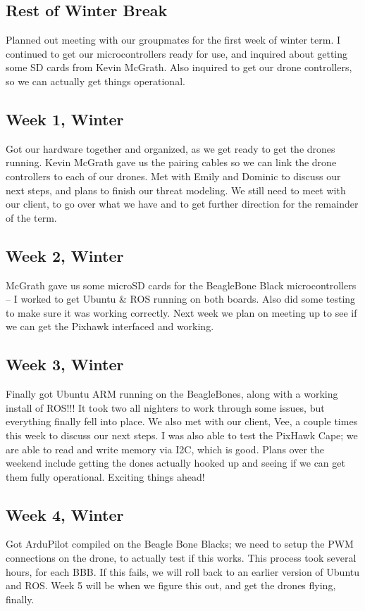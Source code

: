 \documentclass[IEEEtran,letterpaper,10pt,notitlepage,draftclsnofoot,onecolumn]{article}
\begin{document}
\subsection{Rest of Winter Break}
Planned out meeting with our groupmates for the first week of winter term. I continued to get our microcontrollers ready for use, and inquired about getting some SD cards from Kevin McGrath. Also inquired to get our drone controllers, so we can actually get things operational.
\subsection{Week 1, Winter}
Got our hardware together and organized, as we get ready to get the drones running. Kevin McGrath gave us the pairing cables so we can link the drone controllers to each of our drones. Met with Emily and Dominic to discuss our next steps, and plans to finish our threat modeling. We still need to meet with our client, to go over what we have and to get further direction for the remainder of the term.
\subsection{Week 2, Winter}
McGrath gave us some microSD cards for the BeagleBone Black microcontrollers -- I worked to get Ubuntu & ROS running on both boards. Also did some testing to make sure it was working correctly. Next week we plan on meeting up to see if we can get the Pixhawk interfaced and working.
\subsection{Week 3, Winter}
Finally got Ubuntu ARM running on the BeagleBones, along with a working install of ROS!!! It took two all nighters to work through some issues, but everything finally fell into place. We also met with our client, Vee, a couple times this week to discuss our next steps. I was also able to test the PixHawk Cape; we are able to read and write memory via I2C, which is good. Plans over the weekend include getting the dones actually hooked up and seeing if we can get them fully operational. Exciting things ahead!
\subsection{Week 4, Winter}
Got ArduPilot compiled on the Beagle Bone Blacks; we need to setup the PWM connections on the drone, to actually test if this works. This process took several hours, for each BBB. If this fails, we will roll back to an earlier version of Ubuntu and ROS. Week 5 will be when we figure this out, and get the drones flying, finally.
\end{document}
